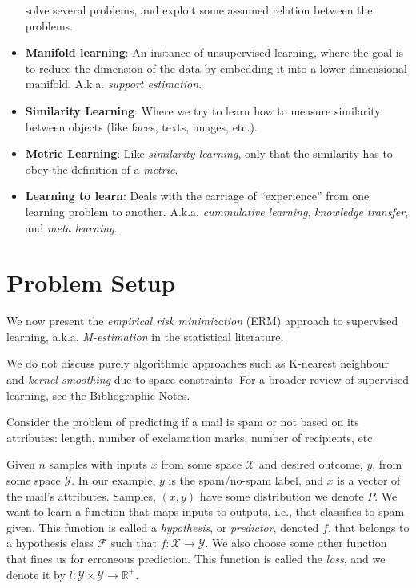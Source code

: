 \documentclass[]{book}
\theoremstyle{definition}
\theoremstyle{definition}
\theoremstyle{definition}
\theoremstyle{remark}
\let\BeginKnitrBlock\begin \let\EndKnitrBlock\end
\begin{document}
\begin{itemize}
  solve several problems, and exploit some assumed relation between the
  problems.
\item
  \textbf{Manifold learning}: An instance of unsupervised learning,
  where the goal is to reduce the dimension of the data by embedding it
  into a lower dimensional manifold. A.k.a. \emph{support estimation}.
\item
  \textbf{Similarity Learning}: Where we try to learn how to measure
  similarity between objects (like faces, texts, images, etc.).
\item
  \textbf{Metric Learning}: Like \emph{similarity learning}, only that
  the similarity has to obey the definition of a \emph{metric}.
\item
  \textbf{Learning to learn}: Deals with the carriage of ``experience''
  from one learning problem to another. A.k.a. \emph{cummulative
  learning}, \emph{knowledge transfer}, and \emph{meta learning}.
\end{itemize}

\section{Problem Setup}\label{problem-setup-3}

We now present the \emph{empirical risk minimization} (ERM) approach to
supervised learning, a.k.a. \emph{M-estimation} in the statistical
literature.

\BeginKnitrBlock{remark}
{}We do not discuss purely algorithmic
approaches such as K-nearest neighbour and \emph{kernel smoothing} due
to space constraints. For a broader review of supervised learning, see
the Bibliographic Notes.
\EndKnitrBlock{remark}

\BeginKnitrBlock{example}[Rental Prices]
\protect\hypertarget{exm:rental-prices}{}{\label{exm:rental-prices}
{} }Consider the problem of predicting if a
mail is spam or not based on its attributes: length, number of
exclamation marks, number of recipients, etc.
\EndKnitrBlock{example}

Given \(n\) samples with inputs \(x\) from some space \(\mathcal{X}\)
and desired outcome, \(y\), from some space \(\mathcal{Y}\). In our
example, \(y\) is the spam/no-spam label, and \(x\) is a vector of the
mail's attributes. Samples, \((x,y)\) have some distribution we denote
\(P\). We want to learn a function that maps inputs to outputs, i.e.,
that classifies to spam given. This function is called a
\emph{hypothesis}, or \emph{predictor}, denoted \(f\), that belongs to a
hypothesis class \(\mathcal{F}\) such that
\(f:\mathcal{X} \to \mathcal{Y}\). We also choose some other function
that fines us for erroneous prediction. This function is called the
\emph{loss}, and we denote it by
\(l:\mathcal{Y}\times \mathcal{Y} \to \mathbb{R}^+\).
\end{document}
